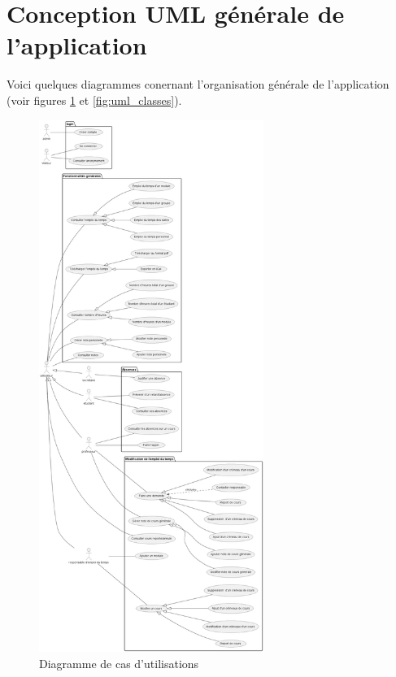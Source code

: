 \documentclass[a4paper,12pt]{article}
\begin{document}
\section{Conception UML générale de l’application}
Voici quelques diagrammes conernant l'organisation générale de l'application (voir figures \ref{fig:uml_uc} et \ref{fig:uml_classes}).\\
\begin{figure}[h]
    \centering
    \includegraphics[width=0.65\textwidth]{UC.png}
    \caption{Diagramme de cas d'utilisations}
    \label{fig:uml_uc}
\end{figure}
\end{document}

